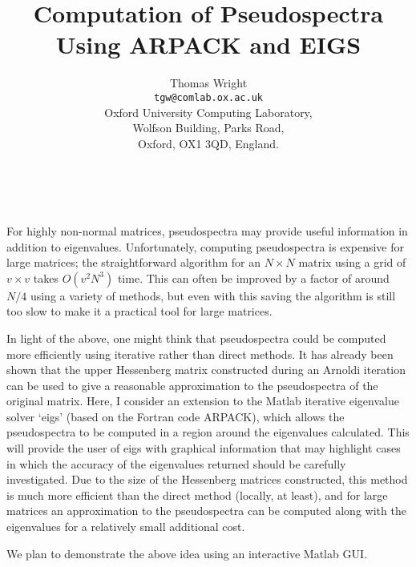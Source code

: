 \documentclass[11pt]{article}
\date{ ~ \hspace{-4mm}}
\title{Computation of Pseudospectra Using ARPACK and EIGS  }
\author{Thomas Wright \\ {\tt tgw@comlab.ox.ac.uk} \\ Oxford University Computing Laboratory,  \\  Wolfson Building, Parks Road,  \\  Oxford, OX1 3QD, England.}
\begin{document}
\maketitle
\thispagestyle{empty}





 



For highly non-normal matrices, pseudospectra may
provide useful
information in addition to eigenvalues. Unfortunately, computing
pseudospectra is expensive for large matrices; the straightforward
algorithm for an
$N\times N$
matrix using a grid of
$v\times v$ takes
$O(v^2 N^3)$ time. This can
often be improved by a 
factor of around $N/4$ using a variety of methods, but even with
this
saving the algorithm is still too slow to make it a practical tool for
large matrices.




In light of the above, one might think that
pseudospectra could be 
computed more efficiently using iterative rather than direct
methods. It has already been shown that the upper Hessenberg matrix
constructed during an Arnoldi iteration can be used to give a
reasonable approximation to the pseudospectra of the original
matrix. Here, I consider an extension to the Matlab iterative
eigenvalue solver `eigs' (based on the Fortran code ARPACK), which
allows the pseudospectra to be computed in a region around
the eigenvalues calculated. This will provide the user of eigs with
graphical information that may highlight cases in which the accuracy
of the eigenvalues returned should be carefully investigated. Due to
the size of the Hessenberg matrices 
constructed, this method is much more efficient than the direct method
(locally, at least), and for large matrices an approximation to the
pseudospectra can be computed along with the eigenvalues for a
relatively small additional cost.




We plan to demonstrate the above idea using an
interactive Matlab GUI. 
\end{document}
